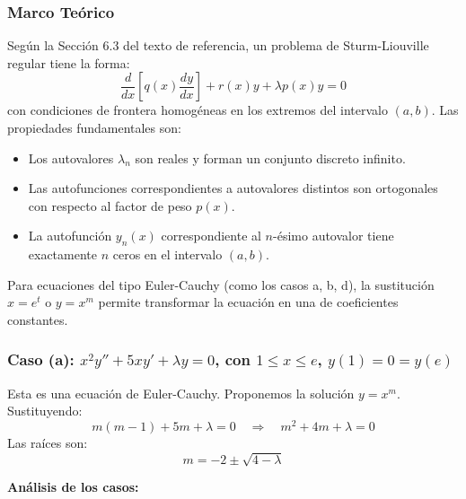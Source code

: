 \documentclass[a4paper]{article}
\begin{document}
\subsubsection{Marco Teórico}

Según la Sección 6.3 del texto de referencia, un problema de Sturm-Liouville regular tiene la forma:
$$
\frac{d}{dx}\left[q(x)\frac{dy}{dx}\right] + r(x)y + \lambda p(x)y = 0
$$
con condiciones de frontera homogéneas en los extremos del intervalo $(a, b)$. Las propiedades fundamentales son:
\begin{itemize}
    \item Los autovalores $\lambda_n$ son reales y forman un conjunto discreto infinito.
    \item Las autofunciones correspondientes a autovalores distintos son ortogonales con respecto al factor de peso $p(x)$.
    \item La autofunción $y_n(x)$ correspondiente al $n$-ésimo autovalor tiene exactamente $n$ ceros en el intervalo $(a, b)$.
\end{itemize}

Para ecuaciones del tipo Euler-Cauchy (como los casos a, b, d), la sustitución $x = e^t$ o $y = x^m$ permite transformar la ecuación en una de coeficientes constantes.

\subsubsection{Caso (a): $x^2y'' + 5xy' + \lambda y = 0$, con $1 \leq x \leq e$, $y(1) = 0 = y(e)$}

Esta es una ecuación de Euler-Cauchy. Proponemos la solución $y = x^m$. Sustituyendo:
$$
m(m-1) + 5m + \lambda = 0 \quad \Rightarrow \quad m^2 + 4m + \lambda = 0
$$
Las raíces son:
$$
m = -2 \pm \sqrt{4 - \lambda}
$$

\textbf{Análisis de los casos:}
\end{document}
